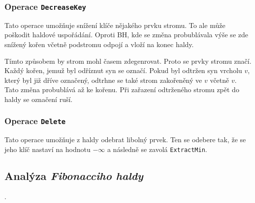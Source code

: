 \subsubsection{Operace \texttt{DecreaseKey}}

Tato operace umožňuje snížení klíče nějakého prvku stromu.
To ale může poškodit haldové uspořádání.
Oproti BH, kde se změna probublávala výše se zde snížený kořen včetně podstromu odpojí a vloží na konec haldy.

Tímto způsobem by strom mohl časem zdegenrovat.
Proto se prvky stromu značí.
Každý kořen, jemuž byl odříznut syn se označí.
Pokud byl odtržen syn vrcholu $v$, který byl již dříve označený, odtrhne se také strom zakořeněný ve $v$ včetně $v$.
Tato změna probublává až ke kořenu.
Při zařazení odtrženého stromu zpět do haldy se označení ruší.

\subsubsection{Operace \texttt{Delete}}

Tato operace umožňuje z haldy odebrat libolný prvek.
Ten se odebere tak, že se jeho klíč nastaví na hodnotu $-\infty$ a následně se zavolá \texttt{ExtractMin}.

\subsection{Analýza \textit{Fibonacciho haldy}}


.
